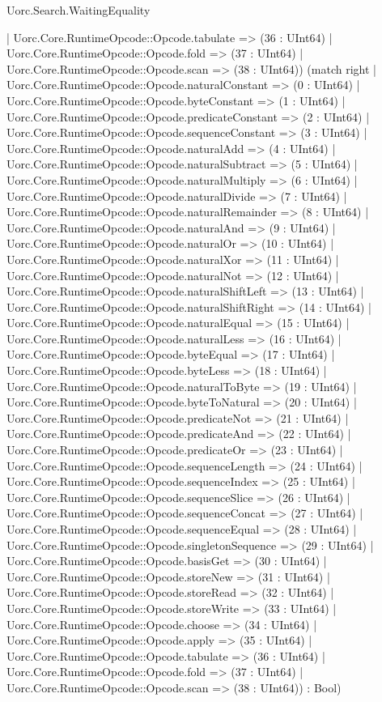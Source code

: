 \begin{lexlean}{Uorc.Search.WaitingEquality}
\begin{semanticmodule}
{    | Uorc.Core.RuntimeOpcode::Opcode.tabulate => (36 : UInt64)
    | Uorc.Core.RuntimeOpcode::Opcode.fold => (37 : UInt64)
    | Uorc.Core.RuntimeOpcode::Opcode.scan => (38 : UInt64)) (match right
    | Uorc.Core.RuntimeOpcode::Opcode.naturalConstant => (0 : UInt64)
    | Uorc.Core.RuntimeOpcode::Opcode.byteConstant => (1 : UInt64)
    | Uorc.Core.RuntimeOpcode::Opcode.predicateConstant => (2 : UInt64)
    | Uorc.Core.RuntimeOpcode::Opcode.sequenceConstant => (3 : UInt64)
    | Uorc.Core.RuntimeOpcode::Opcode.naturalAdd => (4 : UInt64)
    | Uorc.Core.RuntimeOpcode::Opcode.naturalSubtract => (5 : UInt64)
    | Uorc.Core.RuntimeOpcode::Opcode.naturalMultiply => (6 : UInt64)
    | Uorc.Core.RuntimeOpcode::Opcode.naturalDivide => (7 : UInt64)
    | Uorc.Core.RuntimeOpcode::Opcode.naturalRemainder => (8 : UInt64)
    | Uorc.Core.RuntimeOpcode::Opcode.naturalAnd => (9 : UInt64)
    | Uorc.Core.RuntimeOpcode::Opcode.naturalOr => (10 : UInt64)
    | Uorc.Core.RuntimeOpcode::Opcode.naturalXor => (11 : UInt64)
    | Uorc.Core.RuntimeOpcode::Opcode.naturalNot => (12 : UInt64)
    | Uorc.Core.RuntimeOpcode::Opcode.naturalShiftLeft => (13 : UInt64)
    | Uorc.Core.RuntimeOpcode::Opcode.naturalShiftRight => (14 : UInt64)
    | Uorc.Core.RuntimeOpcode::Opcode.naturalEqual => (15 : UInt64)
    | Uorc.Core.RuntimeOpcode::Opcode.naturalLess => (16 : UInt64)
    | Uorc.Core.RuntimeOpcode::Opcode.byteEqual => (17 : UInt64)
    | Uorc.Core.RuntimeOpcode::Opcode.byteLess => (18 : UInt64)
    | Uorc.Core.RuntimeOpcode::Opcode.naturalToByte => (19 : UInt64)
    | Uorc.Core.RuntimeOpcode::Opcode.byteToNatural => (20 : UInt64)
    | Uorc.Core.RuntimeOpcode::Opcode.predicateNot => (21 : UInt64)
    | Uorc.Core.RuntimeOpcode::Opcode.predicateAnd => (22 : UInt64)
    | Uorc.Core.RuntimeOpcode::Opcode.predicateOr => (23 : UInt64)
    | Uorc.Core.RuntimeOpcode::Opcode.sequenceLength => (24 : UInt64)
    | Uorc.Core.RuntimeOpcode::Opcode.sequenceIndex => (25 : UInt64)
    | Uorc.Core.RuntimeOpcode::Opcode.sequenceSlice => (26 : UInt64)
    | Uorc.Core.RuntimeOpcode::Opcode.sequenceConcat => (27 : UInt64)
    | Uorc.Core.RuntimeOpcode::Opcode.sequenceEqual => (28 : UInt64)
    | Uorc.Core.RuntimeOpcode::Opcode.singletonSequence => (29 : UInt64)
    | Uorc.Core.RuntimeOpcode::Opcode.basisGet => (30 : UInt64)
    | Uorc.Core.RuntimeOpcode::Opcode.storeNew => (31 : UInt64)
    | Uorc.Core.RuntimeOpcode::Opcode.storeRead => (32 : UInt64)
    | Uorc.Core.RuntimeOpcode::Opcode.storeWrite => (33 : UInt64)
    | Uorc.Core.RuntimeOpcode::Opcode.choose => (34 : UInt64)
    | Uorc.Core.RuntimeOpcode::Opcode.apply => (35 : UInt64)
    | Uorc.Core.RuntimeOpcode::Opcode.tabulate => (36 : UInt64)
    | Uorc.Core.RuntimeOpcode::Opcode.fold => (37 : UInt64)
    | Uorc.Core.RuntimeOpcode::Opcode.scan => (38 : UInt64)) : Bool)
}


\end{semanticmodule}
\end{lexlean}
